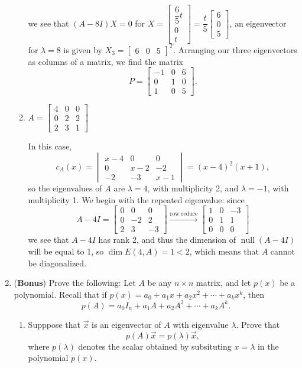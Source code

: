 \documentclass[letterpaper,12pt]{article}
\DeclareMathOperator{\nul}{null}
\begin{document}
\begin{enumerate}
\begin{enumerate}
\[\]
we see that $(A-8I)X=0$ for $X=\begin{bmatrix}\dfrac{6}{5}t\\0\\t\end{bmatrix} = \dfrac{t}{5}\begin{bmatrix}6\\0\\5\end{bmatrix}$, an eigenvector for $\lambda=8$ is given by $X_3 = \begin{bmatrix}6&0&5\end{bmatrix}^T$. Arranging our three eigenvectors as columns of a matrix, we find the matrix
\[
 P = \begin{bmatrix}-1&0&6\\0&1&0\\1&0&5\end{bmatrix}.
\]


 \item $A=\begin{bmatrix}
           4&0&0\\0&2&2\\2&3&1
          \end{bmatrix}$

\bigskip

In this case, 
\[
 c_A(x) = \begin{vmatrix}x-4&0&0\\0&x-2&-2\\-2&-3&x-1\end{vmatrix} = (x-4)^2(x+1),
\]
so the eigenvalues of $A$ are $\lambda =4$, with multiplicity 2, and $\lambda = -1$, with multiplicity 1. We begin with the repeated eigenvalue: since
\[
 A-4I = \begin{bmatrix}0&0&0\\0&-2&2\\2&3&-3\end{bmatrix}\xrightarrow[]{\text{row reduce}}
\begin{bmatrix}1&0&-3\\0&1&1\\0&0&0\end{bmatrix}
\]
we see that $A-4I$ has rank 2, and thus the dimension of $\nul(A-4I)$ will be equal to 1, so $\dim E(4,A)=1<2$, which means that $A$ cannot be diagonalized.
\end{enumerate}

\bigskip

\item ({\bf Bonus}) Prove the following: Let $A$ be any $n\times n$ matrix, and let $p(x)$ be a polynomial. Recall that if $p(x)=a_0+a_1x+a_2x^2+\cdots + a_kx^k$, then
\[
 p(A) = a_0I_n + a_1A + a_2A^2+\cdots + a_kA^k.
\]
\begin{enumerate}
 \item Supppose that $\vec{x}$ is an eigenvector of $A$ with eigenvalue $\lambda$. Prove that
\[
 p(A)\vec{x} = p(\lambda)\vec{x},
\]
where $p(\lambda)$ denotes the scalar obtained by subsituting $x=\lambda$ in the polynomial $p(x)$.


\end{enumerate}
\end{enumerate}
\end{document}
